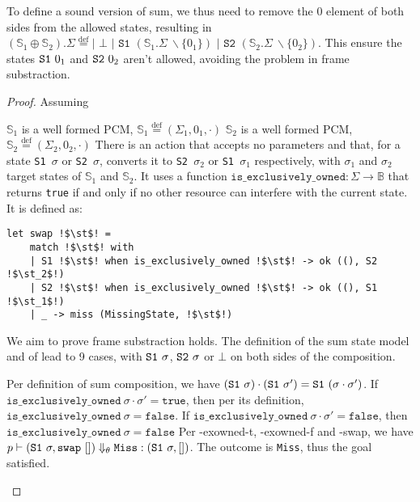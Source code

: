 \documentclass[,a4paper,oneside]{article}
\newcommand{\code}[1]{\texttt{#1}}
\newcommand{\defeq}[0]{\stackrel{\text{def}}=}
\newcommand{\mmdl}[0]{\ensuremath{\mathbb S}}
\newcommand{\rarr}[0]{\ensuremath{\rightarrow}}
\newcommand{\st}[0]{\sigma}
\newcommand{\evalsto}[3]{\ensuremath{p\vdash(#1)\Downarrow_\theta#2:(#3)}}
\newcommand{\Miss}[0]{\code{Miss}}
\newcommand{\bools}[0]{\mathbb{B}}
\newcommand{\vtrue}[0]{\texttt{true}}
\newcommand{\vfalse}[0]{\texttt{false}}
\begin{document}
To define a sound version of sum, we thus need to remove the $0$ element of both sides from the allowed states, resulting in $(\mmdl_1 \oplus \mmdl_2).\Sigma \defeq \code{| }\bot \code{ | S1 } (\mmdl_1.\Sigma~ \backslash \{ 0_1\}) \code{ | S2 } (\mmdl_2.\Sigma~ \backslash \{0_2\})$. This ensure the states $\sone0_1$ and $\stwo0_2$ aren't allowed, avoiding the problem in frame substraction. 

\begin{proof}

Assuming 
\begin{hypvlist}
 $\mmdl_1$ is a well formed PCM, $\mmdl_1 \defeq (\Sigma_1, 0_1, \cdot)$
 $\mmdl_2$ is a well formed PCM, $\mmdl_2 \defeq (\Sigma_2, 0_2, \cdot)$
 There is an action \swap{} that accepts no parameters and that, for a state \code{S1 $\st$} or \code{S2 $\st$}, converts it to \code{S2 $\st_2$} or \code{S1 $\st_1$} respectively, with $\st_1$ and $\st_2$ target states of $\mmdl_1$ and $\mmdl_2$. It uses a function ${\code{is\_exclusively\_owned} : \Sigma\rarr \bools}$ that returns \vtrue{} if and only if no other resource can interfere with the current state. It is defined as: 

\begin{verbatim}
let swap !$\st$! =
	match !$\st$! with
	| S1 !$\st$! when is_exclusively_owned !$\st$! -> ok ((), S2 !$\st_2$!)
	| S2 !$\st$! when is_exclusively_owned !$\st$! -> ok ((), S1 !$\st_1$!)
	| _ -> miss (MissingState, !$\st$!)
\end{verbatim}
\end{hypvlist}
	
We aim to prove  frame substraction holds. The definition of the sum state model and of \swap{} lead to 9 cases, with $\sone\st$, $\stwo\st$ or $\bot$ on both sides of the composition.

\pfcase{$\sone\st$, $\sone\st'$}

\begin{hypvlist}
	 Per definition of sum composition, we have $(\sone\st)\cdot(\sone\st') = \sone(\st\cdot\st')$.
	 If $\code{is\_exclusively\_owned}~\st\cdot\st' = \vtrue$, then per its definition, $\code{is\_exclusively\_owned}~\st=\vfalse$.
	 If $\code{is\_exclusively\_owned}~\st\cdot\st' = \vfalse$, then $\code{is\_exclusively\_owned}~\st = \vfalse$
	 Per \hyp{exowned-t}, \hyp{exowned-f} and \hyp{swap}, we have $\evalsto{\sone\st, \swap~[]}{\Miss}{\sone\st, []}$. The outcome is \Miss, thus the goal  satisfied.
\end{hypvlist}


\end{proof}
\end{document}
